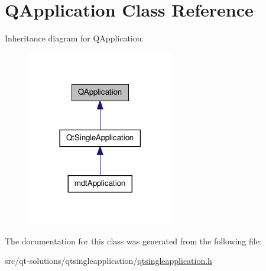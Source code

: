 \hypertarget{class_q_application}{\section{Q\-Application Class Reference}
\label{class_q_application}
}


Inheritance diagram for Q\-Application\-:\nopagebreak
\begin{figure}[H]
\begin{center}
\leavevmode
\includegraphics[width=182pt]{class_q_application__inherit__graph}
\end{center}
\end{figure}


The documentation for this class was generated from the following file\-:\begin{DoxyCompactItemize}
\item 
src/qt-\/solutions/qtsingleapplication/\hyperlink{qtsingleapplication_8h}{qtsingleapplication.\-h}\end{DoxyCompactItemize}
